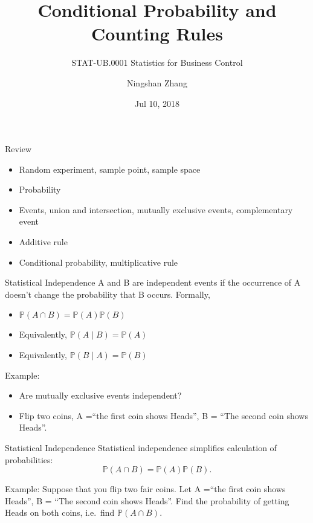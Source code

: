 \documentclass{beamer}
\title{Conditional Probability and Counting Rules}
\subtitle{STAT-UB.0001 Statistics for Business Control}
\author{Ningshan Zhang}
\institute[New York University] %
{
  IOMS Department\\
  nzhang@stern.nyu.edu
}
\date{Jul 10, 2018}
\newcommand{\pr}{\mathbb{P}}
\begin{document}
\begin{frame}
  \titlepage
\end{frame}



\begin{frame}{Review}
\begin{itemize}
\item Random experiment, sample point, sample space
\item Probability
\item Events, union and intersection, mutually exclusive events, complementary event
\item Additive rule
\item Conditional probability, multiplicative rule
\end{itemize}
\end{frame}


\begin{frame}{Statistical Independence}
A and B are independent events if the occurrence of A doesn’t change the probability that B occurs. Formally,
\begin{itemize}
    \item $\pr(A \cap B)=\pr(A)\pr(B)$
    \item Equivalently, $\pr(A \mid B)=\pr(A)$
    \item Equivalently, $\pr(B \mid A)=\pr(B)$
\end{itemize}

Example:
\begin{itemize}
    \item Are mutually exclusive events independent?
    \item Flip two coins, A =``the first coin shows Heads'', B = ``The second coin shows Heads''.
\end{itemize}

\end{frame}

\begin{frame}{Statistical Independence}
Statistical independence simplifies calculation of probabilities:
$$\pr(A\cap B) =\pr(A)\pr(B).$$

Example: Suppose that you flip two fair coins. Let A =``the first coin shows Heads'', 
B = ``The second coin shows Heads''. Find the probability of getting Heads on both coins, i.e.\ find 
$\pr(A \cap B)$.
\end{frame}
\end{document}
